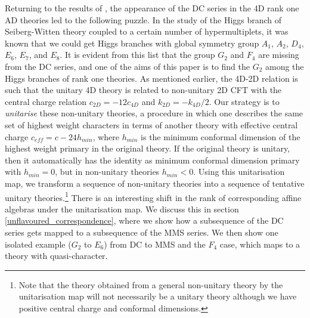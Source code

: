 \documentclass[a4paper,12pt]{article}
\begin{document}
Returning to the results of \cite{Beem:2013sza}, the appearance of the DC series in the 4D rank one AD theories led to the following puzzle. In the study of the Higgs branch of Seiberg-Witten theory coupled to a certain number of hypermultiplets, it was known that we could get Higgs branches with global symmetry group $A_1$, $A_2$, $D_4$, $E_6$, $E_7$, and $E_8$. It is evident from this list that the group $G_2$ and $F_4$ are missing from the DC series, and one of the aims of this paper is to find the $G_2$ among the Higgs branches of rank one theories. As mentioned earlier, the 4D-2D relation is such that the unitary 4D theory is related to non-unitary 2D CFT with the central charge relation $c_{2D} = -12 c_{4D}$ and $k_{2D} = - k_{4D}/2$.  Our strategy is to \textit{unitarise} \cite{Mathur:1988gt,Mathur:1988na} these non-unitary theories, a procedure in which one describes the same set of highest weight characters in terms of another theory with effective central charge $c_{eff} = c-24 h_{min}$, where $h_{min}$ is the minimum conformal dimension of the highest weight primary in the original theory. If the original theory is unitary, then it automatically has the identity as minimum conformal dimension primary with $h_{min}=0$, but in non-unitary theories $h_{min}<0$. Using this unitarisation map, we transform a sequence of non-unitary theories into a sequence of tentative unitary theories.\footnote{Note that the theory obtained from a general non-unitary theory by the unitarisation map will not necessarily be a unitary theory although we have positive central charge and conformal dimensions.} There is an interesting shift in the rank of corresponding affine algebras under the unitarisation map. We discuss this in section \ref{unflavoured_correspondence}, where we show how a subsequence of the DC series gets mapped to a subsequence of the MMS series. We then show one isolated example ($G_2$ to $E_6$) from DC to MMS and the $F_4$ case, which maps to a theory with quasi-character.  
\end{document}
